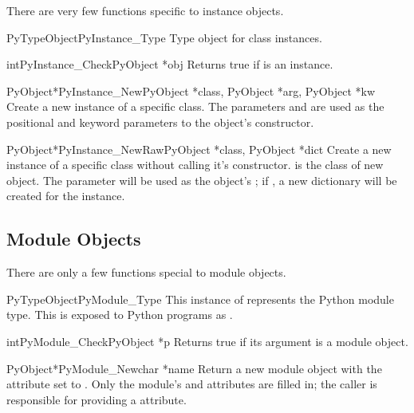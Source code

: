 \documentclass{manual}
\begin{document}
There are very few functions specific to instance objects.

\begin{cvardesc}{PyTypeObject}{PyInstance_Type}
  Type object for class instances.
\end{cvardesc}

\begin{cfuncdesc}{int}{PyInstance_Check}{PyObject *obj}
  Returns true if  is an instance.
\end{cfuncdesc}

\begin{cfuncdesc}{PyObject*}{PyInstance_New}{PyObject *class,
                                             PyObject *arg,
                                             PyObject *kw}
  Create a new instance of a specific class.  The parameters 
  and  are used as the positional and keyword parameters to
  the object's constructor.
\end{cfuncdesc}

\begin{cfuncdesc}{PyObject*}{PyInstance_NewRaw}{PyObject *class,
                                                PyObject *dict}
  Create a new instance of a specific class without calling it's
  constructor.   is the class of new object.  The
   parameter will be used as the object's ;
  if \NULL, a new dictionary will be created for the instance.
\end{cfuncdesc}


\subsection{Module Objects \label{moduleObjects}}

There are only a few functions special to module objects.

\begin{cvardesc}{PyTypeObject}{PyModule_Type}
This instance of  represents the Python module
type.  This is exposed to Python programs as .
\end{cvardesc}

\begin{cfuncdesc}{int}{PyModule_Check}{PyObject *p}
Returns true if its argument is a module object.
\end{cfuncdesc}

\begin{cfuncdesc}{PyObject*}{PyModule_New}{char *name}
Return a new module object with the  attribute set to
.  Only the module's  and
 attributes are filled in; the caller is responsible
for providing a  attribute.
\end{cfuncdesc}
\end{document}
